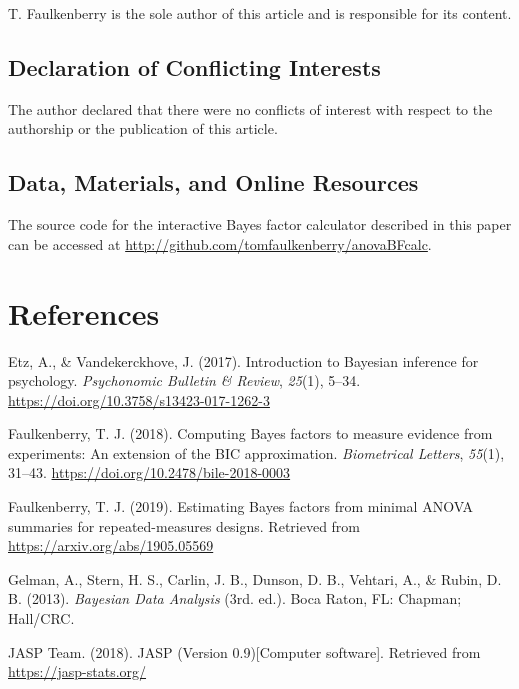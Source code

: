 \documentclass[doc]{apa6}
\begin{document}
T. Faulkenberry is the sole author of this article and is responsible for its content.

\subsection{Declaration of Conflicting Interests}\label{declaration-of-conflicting-interests}

The author declared that there were no conflicts of interest with respect to the authorship or the publication of this article.

\subsection{Data, Materials, and Online Resources}\label{data-materials-and-online-resources}

The source code for the interactive Bayes factor calculator described in this paper can be accessed at \url{http://github.com/tomfaulkenberry/anovaBFcalc}.

\newpage

\section{References}\label{references}

\setlength{\parindent}{-0.5in}
\setlength{\leftskip}{0.5in}

\hypertarget{refs}{}
\leavevmode\hypertarget{ref-etz2017}{}%
Etz, A., \& Vandekerckhove, J. (2017). Introduction to Bayesian inference for psychology. \emph{Psychonomic Bulletin \& Review}, \emph{25}(1), 5--34. \url{https://doi.org/10.3758/s13423-017-1262-3}

\leavevmode\hypertarget{ref-faulkenberry2018}{}%
Faulkenberry, T. J. (2018). Computing Bayes factors to measure evidence from experiments: An extension of the BIC approximation. \emph{Biometrical Letters}, \emph{55}(1), 31--43. \url{https://doi.org/10.2478/bile-2018-0003}

\leavevmode\hypertarget{ref-faulkenberry2019}{}%
Faulkenberry, T. J. (2019). Estimating Bayes factors from minimal ANOVA summaries for repeated-measures designs. Retrieved from \url{https://arxiv.org/abs/1905.05569}

\leavevmode\hypertarget{ref-gelman}{}%
Gelman, A., Stern, H. S., Carlin, J. B., Dunson, D. B., Vehtari, A., \& Rubin, D. B. (2013). \emph{Bayesian Data Analysis} (3rd. ed.). Boca Raton, FL: Chapman; Hall/CRC.

\leavevmode\hypertarget{ref-jasp}{}%
JASP Team. (2018). JASP (Version 0.9){[}Computer software{]}. Retrieved from \url{https://jasp-stats.org/}
\end{document}
